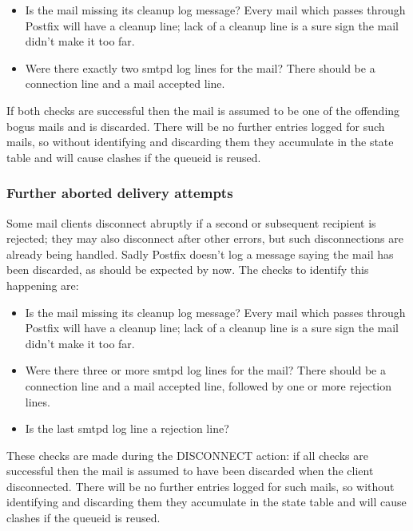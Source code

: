 \documentclass[a4paper,12pt,draft]{article}
\begin{document}
\begin{itemize}

    \item Is the mail missing its cleanup log message?  Every mail which
        passes through Postfix will have a cleanup line; lack of a cleanup
        line is a sure sign the mail didn't make it too far.

    \item Were there exactly two smtpd log lines for the mail?  There
        should be a connection line and a mail accepted line.

\end{itemize}

If both checks are successful then the mail is assumed to be one of the
offending bogus mails and is discarded.  There will be no further entries
logged for such mails, so without identifying and discarding them they
accumulate in the state table and will cause clashes if the queueid is
reused.

\subsubsection{Further aborted delivery attempts}

Some mail clients disconnect abruptly if a second or subsequent recipient
is rejected; they may also disconnect after other errors, but such
disconnections are already being handled.  Sadly Postfix doesn't log a
message saying the mail has been discarded, as should be expected by now.
The checks to identify this happening are:

\begin{itemize}

    \item Is the mail missing its cleanup log message?  Every mail which
        passes through Postfix will have a cleanup line; lack of a cleanup
        line is a sure sign the mail didn't make it too far.

    \item Were there three or more smtpd log lines for the mail?  There
        should be a connection line and a mail accepted line, followed by
        one or more rejection lines.

    \item Is the last smtpd log line a rejection line?

\end{itemize}

These checks are made during the DISCONNECT action: if all checks are
successful then the mail is assumed to have been discarded when the client
disconnected.  There will be no further entries logged for such mails, so
without identifying and discarding them they accumulate in the state table
and will cause clashes if the queueid is reused.
\end{document}
